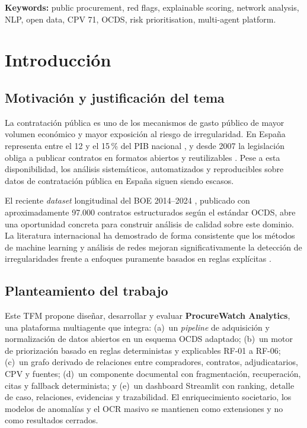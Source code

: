 \documentclass[11pt,a4paper,spanish]{book}
\numberwithin{equation}{chapter}
\numberwithin{figure}{chapter}
\begin{document}
\medskip
{\bf Keywords:} public procurement, red flags, explainable scoring, network analysis, NLP, open data, CPV 71, OCDS, risk prioritisation, multi-agent platform.

\mainmatter
\chapter{Introducci{\'o}n}

\section{Motivaci{\'o}n y justificaci{\'o}n del tema}

La contrataci{\'o}n p{\'u}blica es uno de los mecanismos de gasto p{\'u}blico de mayor volumen econ{\'o}mico y mayor exposici{\'o}n al riesgo de irregularidad. En Espa{\~n}a representa entre el 12 y el 15\,\% del PIB nacional \cite{OECD2016Corruption}, y desde 2007 la legislaci{\'o}n obliga a publicar contratos en formatos abiertos y reutilizables \cite{LCSP2017}. Pese a esta disponibilidad, los an{\'a}lisis sistem{\'a}ticos, automatizados y reproducibles sobre datos de contrataci{\'o}n p{\'u}blica en Espa{\~n}a siguen siendo escasos.

El reciente \textit{dataset} longitudinal del BOE 2014--2024 \cite{MunozPla2026}, publicado con aproximadamente 97.000 contratos estructurados seg{\'u}n el est{\'a}ndar OCDS, abre una oportunidad concreta para construir an{\'a}lisis de calidad sobre este dominio. La literatura internacional ha demostrado de forma consistente que los m{\'e}todos de machine learning y an{\'a}lisis de redes mejoran significativamente la detecci{\'o}n de irregularidades frente a enfoques puramente basados en reglas expl{\'i}citas \cite{Wachs2025ML,Fazekas2020DIGIWHIST,Coviello2023Italian}.

\section{Planteamiento del trabajo}

Este TFM propone dise{\~n}ar, desarrollar y evaluar \textbf{ProcureWatch Analytics}, una plataforma multiagente que integra: (a)~un \textit{pipeline} de adquisici{\'o}n y normalizaci{\'o}n de datos abiertos en un esquema OCDS adaptado; (b)~un motor de priorizaci{\'o}n basado en reglas deterministas y explicables RF-01 a RF-06; (c)~un grafo derivado de relaciones entre compradores, contratos, adjudicatarios, CPV y fuentes; (d)~un componente documental con fragmentaci{\'o}n, recuperaci{\'o}n, citas y fallback determinista; y (e)~un dashboard Streamlit con ranking, detalle de caso, relaciones, evidencias y trazabilidad. El enriquecimiento societario, los modelos de anomal{\'i}as y el OCR masivo se mantienen como extensiones y no como resultados cerrados.
\end{document}
